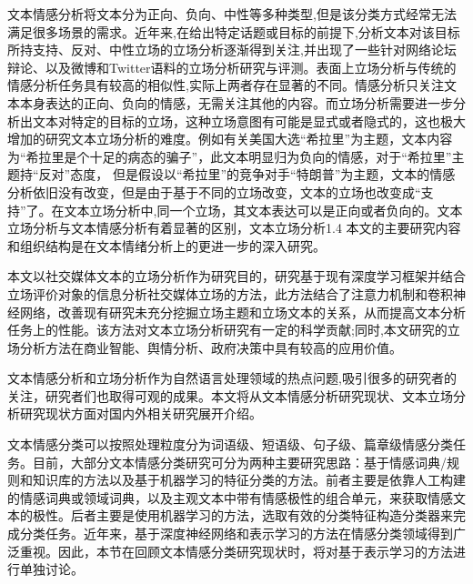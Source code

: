 文本情感分析将文本分为正向、负向、中性等多种类型,但是该分类方式经常无法满足很多场景的需求。近年来,在给出特定话题或目标的前提下,分析文本对该目标所持支持、反对、中性立场的立场分析逐渐得到关注,并出现了一些针对网络论坛辩论、以及微博和Twitter语料的立场分析研究与评测。表面上立场分析与传统的情感分析任务具有较高的相似性,实际上两者存在显著的不同。情感分析只关注文本本身表达的正向、负向的情感，无需关注其他的内容。而立场分析需要进一步分析出文本对特定的目标的立场，这种立场意图有可能是显式或者隐式的，这也极大增加的研究文本立场分析的难度。例如有关美国大选“希拉里”为主题，文本内容为“希拉里是个十足的病态的骗子”，此文本明显归为负向的情感，对于“希拉里”主题持“反对”态度， 但是假设以“希拉里”的竞争对手“特朗普”为主题，文本的情感分析依旧没有改变，但是由于基于不同的立场改变，文本的立场也改变成“支持”了。在文本立场分析中,同一个立场，其文本表达可以是正向或者负向的。文本立场分析与文本情感分析有着显著的区别，文本立场分析1.4 本文的主要研究内容和组织结构是在文本情绪分析上的更进一步的深入研究。

本文以社交媒体文本的立场分析作为研究目的，研究基于现有深度学习框架并结合立场评价对象的信息分析社交媒体立场的方法，此方法结合了注意力机制和卷积神经网络，改善现有研究未充分挖掘立场主题和立场文本的关系，从而提高文本分析任务上的性能。该方法对文本立场分析研究有一定的科学贡献;同时,本文研究的立场分析方法在商业智能、舆情分析、政府决策中具有较高的应用价值。



文本情感分析和立场分析作为自然语言处理领域的热点问题,吸引很多的研究者的关注，研究者们也取得可观的成果。本文将从文本情感分析研究现状、文本立场分析研究现状方面对国内外相关研究展开介绍。



文本情感分类可以按照处理粒度分为词语级、短语级、句子级、篇章级情感分类任务。目前，大部分文本情感分类研究可分为两种主要研究思路：基于情感词典/规则和知识库的方法以及基于机器学习的特征分类的方法。前者主要是依靠人工构建的情感词典或领域词典，以及主观文本中带有情感极性的组合单元，来获取情感文本的极性。后者主要是使用机器学习的方法，选取有效的分类特征构造分类器来完成分类任务。近年来，基于深度神经网络和表示学习的方法在情感分类领域得到广泛重视。因此，本节在回顾文本情感分类研究现状时，将对基于表示学习的方法进行单独讨论。

